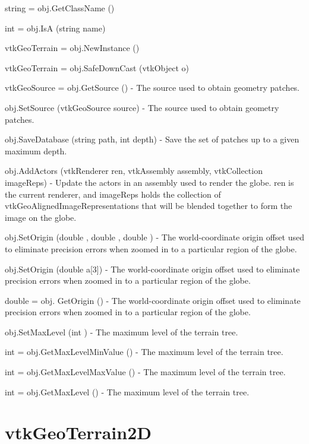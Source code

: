 \begin{DoxyItemize}
\item {\ttfamily string = obj.\-Get\-Class\-Name ()}  
\item {\ttfamily int = obj.\-Is\-A (string name)}  
\item {\ttfamily vtk\-Geo\-Terrain = obj.\-New\-Instance ()}  
\item {\ttfamily vtk\-Geo\-Terrain = obj.\-Safe\-Down\-Cast (vtk\-Object o)}  
\item {\ttfamily vtk\-Geo\-Source = obj.\-Get\-Source ()} -\/ The source used to obtain geometry patches.  
\item {\ttfamily obj.\-Set\-Source (vtk\-Geo\-Source source)} -\/ The source used to obtain geometry patches.  
\item {\ttfamily obj.\-Save\-Database (string path, int depth)} -\/ Save the set of patches up to a given maximum depth.  
\item {\ttfamily obj.\-Add\-Actors (vtk\-Renderer ren, vtk\-Assembly assembly, vtk\-Collection image\-Reps)} -\/ Update the actors in an assembly used to render the globe. ren is the current renderer, and image\-Reps holds the collection of vtk\-Geo\-Aligned\-Image\-Representations that will be blended together to form the image on the globe.  
\item {\ttfamily obj.\-Set\-Origin (double , double , double )} -\/ The world-\/coordinate origin offset used to eliminate precision errors when zoomed in to a particular region of the globe.  
\item {\ttfamily obj.\-Set\-Origin (double a\mbox{[}3\mbox{]})} -\/ The world-\/coordinate origin offset used to eliminate precision errors when zoomed in to a particular region of the globe.  
\item {\ttfamily double = obj. Get\-Origin ()} -\/ The world-\/coordinate origin offset used to eliminate precision errors when zoomed in to a particular region of the globe.  
\item {\ttfamily obj.\-Set\-Max\-Level (int )} -\/ The maximum level of the terrain tree.  
\item {\ttfamily int = obj.\-Get\-Max\-Level\-Min\-Value ()} -\/ The maximum level of the terrain tree.  
\item {\ttfamily int = obj.\-Get\-Max\-Level\-Max\-Value ()} -\/ The maximum level of the terrain tree.  
\item {\ttfamily int = obj.\-Get\-Max\-Level ()} -\/ The maximum level of the terrain tree.  
\end{DoxyItemize}\hypertarget{vtkgeovis_vtkgeoterrain2d}{}\section{vtk\-Geo\-Terrain2\-D}\label{vtkgeovis_vtkgeoterrain2d}
